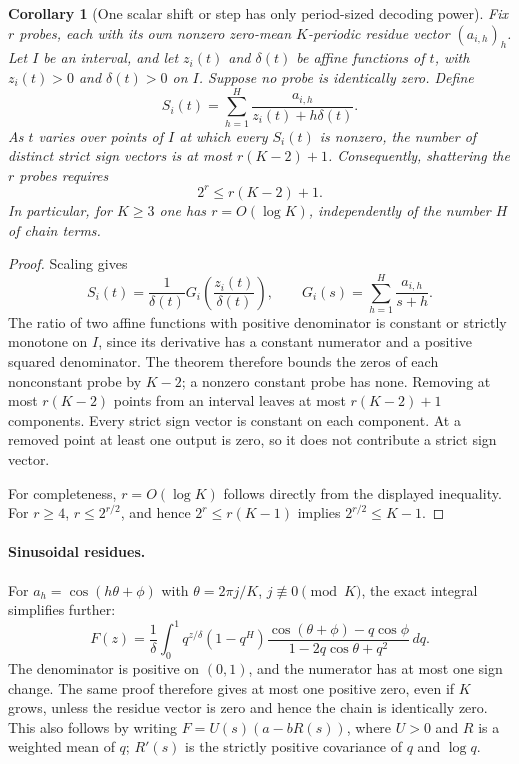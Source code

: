 \documentclass[11pt]{article}
\newtheorem{corollary}{Corollary}
\begin{document}
\begin{corollary}[One scalar shift or step has only period-sized decoding power]
Fix $r$ probes, each with its own nonzero zero-mean $K$-periodic
residue vector $(a_{i,h})_h$. Let $I$ be an interval, and let
$z_i(t)$ and $\delta(t)$ be affine functions of $t$, with
$z_i(t)>0$ and $\delta(t)>0$ on $I$. Suppose no probe is identically
zero. Define
\[
 S_i(t)=\sum_{h=1}^{H}\frac{a_{i,h}}{z_i(t)+h\delta(t)}.
\]
As $t$ varies over points of $I$ at which every $S_i(t)$ is nonzero,
the number of distinct strict sign vectors is at most
$r(K-2)+1$. Consequently, shattering the $r$ probes requires
\[
 2^r\le r(K-2)+1.
\]
In particular, for $K\ge3$ one has $r=O(\log K)$, independently
of the number $H$ of chain terms.
\end{corollary}

\begin{proof}
Scaling gives
\[
 S_i(t)=\frac1{\delta(t)}G_i\!\left(\frac{z_i(t)}{\delta(t)}\right),
 \qquad G_i(s)=\sum_{h=1}^H\frac{a_{i,h}}{s+h}.
\]
The ratio of two affine functions with positive denominator is
constant or strictly monotone on $I$, since its derivative has a
constant numerator and a positive squared denominator. The theorem
therefore bounds the zeros of each nonconstant probe by $K-2$;
a nonzero constant probe has none. Removing at most $r(K-2)$
points from an interval leaves at most $r(K-2)+1$ components.
Every strict sign vector is constant on each component. At a removed
point at least one output is zero, so it does not contribute a strict
sign vector.

For completeness, $r=O(\log K)$ follows directly from the displayed
inequality. For $r\ge4$, $r\le2^{r/2}$, and hence
$2^r\le r(K-1)$ implies $2^{r/2}\le K-1$.
\end{proof}

\paragraph{Sinusoidal residues.}
For $a_h=\cos(h\theta+\phi)$ with
$\theta=2\pi j/K$, $j\not\equiv0\pmod K$, the exact integral
simplifies further:
\[
 F(z)=\frac1\delta\int_0^1q^{z/\delta}(1-q^H)
 \frac{\cos(\theta+\phi)-q\cos\phi}
      {1-2q\cos\theta+q^2}\,dq.
\]
The denominator is positive on $(0,1)$, and the numerator has at
most one sign change. The same proof therefore gives at most one
positive zero, even if $K$ grows, unless the residue vector is zero
and hence the chain is identically zero. This also follows by writing
$F=U(s)(a-bR(s))$, where $U>0$ and $R$ is a weighted mean of $q$;
$R'(s)$ is the strictly positive covariance of $q$ and $\log q$.
\end{document}
